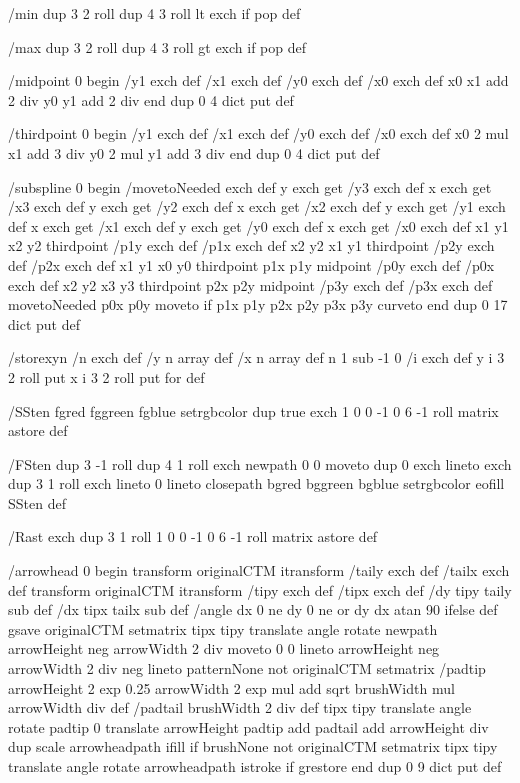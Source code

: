 /min {
dup 3 2 roll dup 4 3 roll lt { exch } if pop
} def

/max {
dup 3 2 roll dup 4 3 roll gt { exch } if pop
} def

/midpoint {
0 begin
/y1 exch def
/x1 exch def
/y0 exch def
/x0 exch def
x0 x1 add 2 div
y0 y1 add 2 div
end
} dup 0 4 dict put def

/thirdpoint {
0 begin
/y1 exch def
/x1 exch def
/y0 exch def
/x0 exch def
x0 2 mul x1 add 3 div
y0 2 mul y1 add 3 div
end
} dup 0 4 dict put def

/subspline {
0 begin
/movetoNeeded exch def
y exch get /y3 exch def
x exch get /x3 exch def
y exch get /y2 exch def
x exch get /x2 exch def
y exch get /y1 exch def
x exch get /x1 exch def
y exch get /y0 exch def
x exch get /x0 exch def
x1 y1 x2 y2 thirdpoint
/p1y exch def
/p1x exch def
x2 y2 x1 y1 thirdpoint
/p2y exch def
/p2x exch def
x1 y1 x0 y0 thirdpoint
p1x p1y midpoint
/p0y exch def
/p0x exch def
x2 y2 x3 y3 thirdpoint
p2x p2y midpoint
/p3y exch def
/p3x exch def
movetoNeeded { p0x p0y moveto } if
p1x p1y p2x p2y p3x p3y curveto
end
} dup 0 17 dict put def

/storexyn {
/n exch def
/y n array def
/x n array def
n 1 sub -1 0 {
/i exch def
y i 3 2 roll put
x i 3 2 roll put
} for
} def

/SSten {
fgred fggreen fgblue setrgbcolor
dup true exch 1 0 0 -1 0 6 -1 roll matrix astore
} def

/FSten {
dup 3 -1 roll dup 4 1 roll exch
newpath
0 0 moveto
dup 0 exch lineto
exch dup 3 1 roll exch lineto
0 lineto
closepath
bgred bggreen bgblue setrgbcolor
eofill
SSten
} def

/Rast {
exch dup 3 1 roll 1 0 0 -1 0 6 -1 roll matrix astore
} def


/arrowhead {
0 begin
transform originalCTM itransform
/taily exch def
/tailx exch def
transform originalCTM itransform
/tipy exch def
/tipx exch def
/dy tipy taily sub def
/dx tipx tailx sub def
/angle dx 0 ne dy 0 ne or { dy dx atan } { 90 } ifelse def
gsave
originalCTM setmatrix
tipx tipy translate
angle rotate
newpath
arrowHeight neg arrowWidth 2 div moveto
0 0 lineto
arrowHeight neg arrowWidth 2 div neg lineto
patternNone not {
originalCTM setmatrix
/padtip arrowHeight 2 exp 0.25 arrowWidth 2 exp mul add sqrt brushWidth mul
arrowWidth div def
/padtail brushWidth 2 div def
tipx tipy translate
angle rotate
padtip 0 translate
arrowHeight padtip add padtail add arrowHeight div dup scale
arrowheadpath
ifill
} if
brushNone not {
originalCTM setmatrix
tipx tipy translate
angle rotate
arrowheadpath
istroke
} if
grestore
end
} dup 0 9 dict put def

